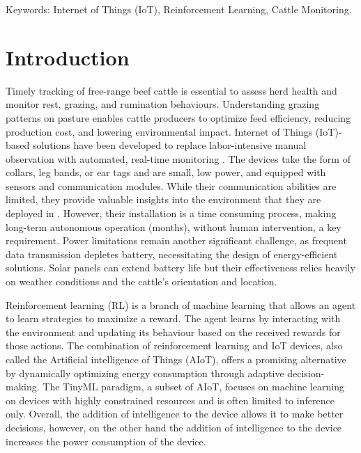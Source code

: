 \documentclass[10pt]{cai}
\begin{document}
\begin{keywords}{Keywords:}
Internet of Things (IoT), Reinforcement Learning, Cattle Monitoring.
\end{keywords}
\copyrightnotice

\section{Introduction}
Timely tracking of free-range beef cattle is essential to assess herd health and monitor rest, grazing, and rumination behaviours.
Understanding grazing patterns on pasture enables cattle producers to optimize feed efficiency, reducing production cost, and lowering environmental impact.
Internet of Things (IoT)-based solutions have been developed to replace labor-intensive manual observation with automated, real-time monitoring \cite{unoldIoTBasedCowHealth2020} \cite{yamsaniIoTBasedLivestockMonitoring2024}.
The devices take the form of collars, leg bands, or ear tags and are small, low power, and equipped with sensors and communication modules.
While their communication abilities are limited, they provide valuable insights into the environment that they are deployed in \cite{unoldIoTBasedCowHealth2020} \cite{moutaouakilDigitalFarmingSurvey2023}.
However, their installation is a time consuming process, making long-term autonomous operation (months), without human intervention, a key requirement.
Power limitations remain another significant challenge, as frequent data transmission depletes battery, necessitating the design of energy-efficient solutions.
Solar panels can extend battery life but their effectiveness relies heavily on weather conditions and the cattle's orientation and location.

Reinforcement learning (RL) is a branch of machine learning that allows an agent to learn strategies to maximize a reward.
The agent learns by interacting with the environment and updating its behaviour based on the received rewards for those actions\cite{suttonReinforcementLearningIntroduction2020}.
The combination of reinforcement learning and IoT devices, also called the Artificial intelligence of Things (AIoT), offers a promising alternative by dynamically optimizing energy consumption through adaptive decision-making.
The TinyML paradigm, a subset of AIoT, focuses on machine learning on devices with highly constrained resources and is often limited to inference only\cite{rayReviewTinyMLStateoftheart2022}.
Overall, the addition of intelligence to the device allows it to make better decisions, however, on the other hand the addition of intelligence to the device increases the power consumption of the device.
\end{document}
